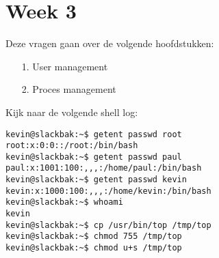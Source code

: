 %
%
%
%

\section{Week 3}
Deze vragen gaan over de volgende hoofdstukken:
\begin{itemize}
\item[1.] User management
\item[2.] Proces management
\end{itemize}

\question[0] Kijk naar de volgende shell log:
\begin{lstlisting}
kevin@slackbak:~$ getent passwd root
root:x:0:0::/root:/bin/bash
kevin@slackbak:~$ getent passwd paul
paul:x:1001:100:,,,:/home/paul:/bin/bash
kevin@slackbak:~$ getent passwd kevin
kevin:x:1000:100:,,,:/home/kevin:/bin/bash
kevin@slackbak:~$ whoami
kevin
kevin@slackbak:~$ cp /usr/bin/top /tmp/top 
kevin@slackbak:~$ chmod 755 /tmp/top
kevin@slackbak:~$ chmod u+s /tmp/top
\end{lstlisting}%

